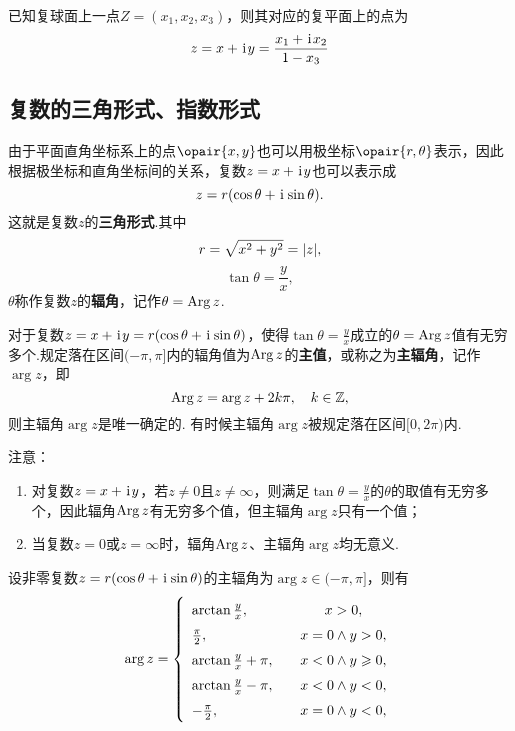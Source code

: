 \begin{theorem}
已知复球面上一点\(Z=(x_1,x_2,x_3)\)，则其对应的复平面上的点为\[
z = x+\kern1pt\mathrm{i}\kern1pt y = \frac{x_1+\kern1pt\mathrm{i}\kern1pt x_2}{1-x_3}
\]
\end{theorem}

\subsection{复数的三角形式、指数形式}
\begin{definition}[复数的三角形式]
由于平面直角坐标系上的点\(\opair{x,y}\)也可以用极坐标\(\opair{r,\theta}\)表示，因此根据极坐标和直角坐标间的关系，复数\(z=x+\kern1pt\mathrm{i}\kern1pt y\)也可以表示成\[
z = r(\cos\theta+\kern1pt\mathrm{i}\kern1pt\sin\theta).
\]这就是复数\(z\)的\textbf{三角形式}.其中\[
r = \sqrt{x^2+y^2} = \abs{z},
\]\[
\tan\theta = \frac{y}{x},
\]\(\theta\)称作复数\(z\)的\textbf{辐角}，记作\(\theta = \operatorname{Arg}{z}\).

对于复数\(z=x+\kern1pt\mathrm{i}\kern1pt y=r(\cos\theta+\kern1pt\mathrm{i}\kern1pt\sin\theta)\)，使得\(\tan\theta=\frac{y}{x}\)成立的\(\theta=\operatorname{Arg}{z}\)值有无穷多个.规定落在区间\((-\pi,\pi]\)内的辐角值为\(\operatorname{Arg}{z}\)的\textbf{主值}，或称之为\textbf{主辐角}，记作\(\arg{z}\)，即\[
\operatorname{Arg}{z} = \arg{z} + 2k\pi, \quad k\in\mathbb{Z},
\]则主辐角\(\arg{z}\)是唯一确定的.
有时候主辐角\(\arg{z}\)被规定落在区间\([0,2\pi)\)内.

注意：\begin{enumerate}
\item 对复数\(z = x + \kern1pt\mathrm{i}\kern1pt y\)，若\(z \neq 0\)且\(z \neq \infty\)，则满足\(\tan \theta = \frac{y}{x}\)的\(\theta\)的取值有无穷多个，因此辐角\(\operatorname{Arg} z\)有无穷多个值，但主辐角\(\arg z\)只有一个值；
\item 当复数\(z = 0\)或\(z = \infty\)时，辐角\(\operatorname{Arg}{z}\)、主辐角\(\arg{z}\)均无意义.
\end{enumerate}
\end{definition}

\begin{theorem}
设非零复数\(z=r(\cos\theta+\kern1pt\mathrm{i}\kern1pt\sin\theta)\)的主辐角为\(\arg{z} \in (-\pi,\pi]\)，则有\[
\def\arraystretch{1.5}
\arg{z} = \left\{ \begin{array}{lc}
\arctan{\frac{y}{x}}, &\quad x > 0, \\
\frac{\pi}{2}, &\quad x = 0 \land y > 0, \\
\arctan{\frac{y}{x}} + \pi, &\quad x < 0 \land y \geqslant 0, \\
\arctan{\frac{y}{x}} - \pi, &\quad x < 0 \land y < 0, \\
-\frac{\pi}{2}, &\quad x = 0 \land y < 0,
\end{array} \right.
\]
\end{theorem}

